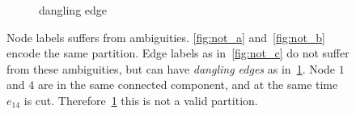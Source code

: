 \begin{center}
\begin{figure}[h]
\begin{tiny}
\begin{subfigure}[t]{0.22\linewidth}
{    }
\caption{ \tiny{dangling edge}}
\label{fig:not_d}
\end{subfigure}
\end{tiny}
\vspace{-0.1cm}
\caption{
Node labels suffers from ambiguities.
\ref{fig:not_a} and~\ref{fig:not_b} encode the same partition.
Edge labels as in~\ref{fig:not_c} do not suffer from these 
ambiguities, but can have \emph{dangling edges} as in~\ref{fig:not_d}.
Node $1$ and $4$
are in the same connected component,
and at the same time $e_{14}$ is cut.
Therefore~\ref{fig:not_d} this is not a valid partition.
}\label{fig:notation}
\end{figure}
\end{center}

